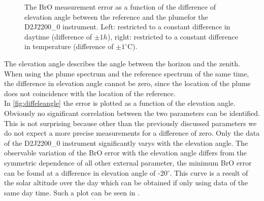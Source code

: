 \begin{figure}
	\caption{The BrO measurement error as a function of the difference of elevation angle between the reference and the plumefor the D2J2200\_0 instrument. Left: restricted to a constant difference in daytime (difference of $\pm 1h$), right: restricted to a constant difference in temperature (difference of $\pm 1^\circ$C).}
	\label{fig:d2j22000diffelevangleonetempnevad}
\end{figure}


The elevation angle describes the angle between the horizon and the zenith. When using the plume spectrum and the reference spectrum of the same time, the difference in elevation angle cannot be zero, since the location of the plume does not coincidence with the location of the reference.\\
In \cref{fig:diffeleangle} the  error is plotted as a function of the elevation angle. Obviously no significant correlation between the two parameters can be identified. This is not surprising because other than the previously discussed parameters we do not expect a more precise measurements for a difference of zero. 
Only the data of the D2J2200\_0 instrument significantly varys with the elevation angle. The observable variation of the BrO error with the elevation angle differs from the symmetric dependence of all other external parameter, the minimum BrO error can be found at a difference in elevation angle of -20$^{\circ}$. This curve is a result of the solar altitude over the day which can be obtained if only using data of the same day time. Such a plot can be seen in \cite{fig:d2j22000diffelevangleonetempnevad}.
	
